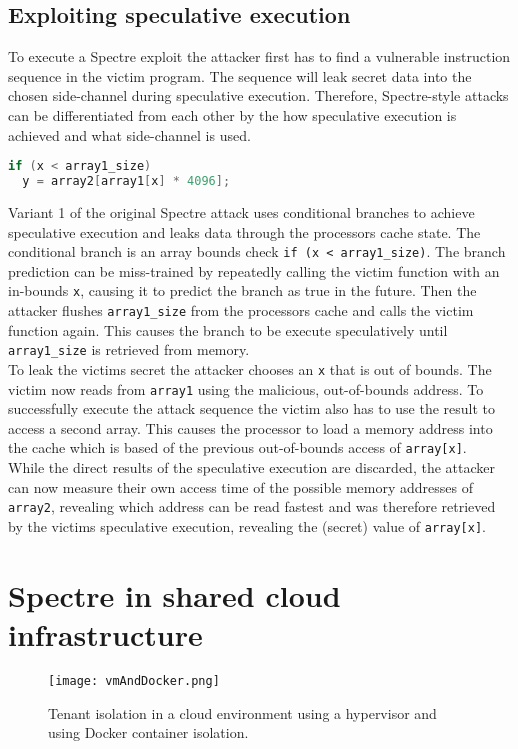 \documentclass[conference,compsoc,final,a4paper]{IEEEtran}
\begin{document}
\subsection{Exploiting speculative execution}
To execute a Spectre exploit the attacker first has to find a vulnerable instruction sequence in the victim program. The sequence will leak secret data into the chosen side-channel during speculative execution. Therefore, Spectre-style attacks can be differentiated from each other by the how speculative execution is achieved and what side-channel is used. \cite{kocher2018spectre} \\
\begin{lstlisting}[language=C, caption=Spectre Variant 1 example \cite{kocher2018spectre}]
if (x < array1_size)
  y = array2[array1[x] * 4096];
\end{lstlisting}
Variant 1 of the original Spectre attack uses conditional branches to achieve speculative execution and leaks data through the processors cache state. The conditional branch is an array bounds check \lstinline|if (x < array1_size)|. The branch prediction can be miss-trained by repeatedly calling the victim function with an in-bounds \lstinline|x|, causing it to predict the branch as true in the future. Then the attacker flushes \lstinline|array1_size| from the processors cache and calls the victim function again. This causes the branch to be execute speculatively until \lstinline|array1_size| is retrieved from memory. \\
To leak the victims secret the attacker chooses an \lstinline|x| that is out of bounds. The victim now reads from \lstinline|array1| using the malicious, out-of-bounds address. To successfully execute the attack sequence the victim also has to use the result to access a second array. This causes the processor to load a memory address into the cache which is based of the previous out-of-bounds access of \lstinline|array[x]|. \\
While the direct results of the speculative execution are discarded, the attacker can now measure their own access time of the possible memory addresses of \lstinline|array2|, revealing which address can be read fastest and was therefore retrieved by the victims speculative execution, revealing the (secret) value of \lstinline|array[x]|.
\section{Spectre in shared cloud infrastructure}
\begin{figure}[!ht]
\centering
\texttt{[image: vmAndDocker.png]}
\caption{Tenant isolation in a cloud environment using a hypervisor and using Docker container isolation.}
\label{virtmem}
\end{figure}
\end{document}
